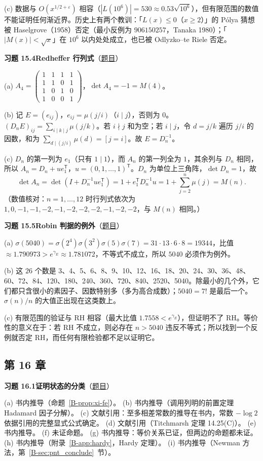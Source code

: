 \documentclass[11pt,a4paper]{article}
\newcommand{\bref}[1]{\ref*{B-#1}}
\newcommand{\Sol}[2]{%
  \par\addvspace{1.2em}\noindent
  \hypertarget{s:#1}{}\textbf{习题 #1\quad #2}\hfill{\small（\hyperlink{q:#1}{题目}）}\par
  \nopagebreak\smallskip}
\begin{document}
(c) 数据与 $O(x^{1/2+\varepsilon})$ 相容（$|L(10^6)|=530\approx0.53\sqrt{10^6}$），但有限范围的数值不能证明任何渐近界。历史上有两个教训：「$L(x)\le0$（$x\ge2$）」的 Pólya 猜想被 Haselgrove（1958）否定（最小反例为 $906150257$，Tanaka 1980）；「$|M(x)|<\sqrt x$」在 $10^6$ 以内处处成立，也已被 Odlyzko--te Riele 否定。

\Sol{15.4}{Redheffer 行列式}
(a) $A_4=\begin{pmatrix}1&1&1&1\\1&1&0&1\\1&0&1&0\\1&0&0&1\end{pmatrix}$，$\det A_4=-1=M(4)$。

(b) 记 $E=(e_{ij})$，$e_{ij}=\mu(j/i)$（$i\mid j$），否则为 $0$。$(D_nE)_{ij}=\sum_{i\mid k\mid j}\mu(j/k)$。若 $i\nmid j$ 和为空；若 $i\mid j$，令 $d=j/k$ 遍历 $j/i$ 的因数，和为 $\sum_{d\mid(j/i)}\mu(d)=[j=i]$。故 $E=D_n^{-1}$。

(c) $D_n$ 的第一列为 $e_1$（只有 $1\mid1$），而 $A_n$ 的第一列全为 $1$，其余列与 $D_n$ 相同，所以 $A_n=D_n+ue_1^{\mathsf T}$，$u=(0,1,\dots,1)^{\mathsf T}$。$D_n$ 为单位上三角阵，$\det D_n=1$，故
\[
  \det A_n=\det(I+D_n^{-1}ue_1^{\mathsf T})=1+e_1^{\mathsf T}D_n^{-1}u=1+\sum_{j=2}^n\mu(j)=M(n).
\]
（数值核对：$n=1,\dots,12$ 时行列式依次为 $1,0,-1,-1,-2,-1,-2,-2,-2,-1,-2,-2$，与 $M(n)$ 相同。）

\Sol{15.5}{Robin 判据的例外}
(a) $\sigma(5040)=\sigma(2^4)\sigma(3^2)\sigma(5)\sigma(7)=31\cdot13\cdot6\cdot8=19344$，比值 $\approx1.790973>e^{\gamma_E}\approx1.781072$，不等式不成立，所以 $5040$ 必须作为例外。

(b) 这 $26$ 个数是 3、4、5、6、8、9、10、12、16、18、20、24、30、36、48、60、72、84、120、180、240、360、720、840、2520、5040。除最小的几个外，它们都只含很小的素因子、因数特别多（多为高合成数）；$5040=7!$ 是最后一个。$\sigma(n)/n$ 的大值正出现在这类数上。

(c) 有限范围的验证与 RH 相容（最大比值 $1.7558<e^{\gamma_E}$），但证明不了 RH。等价性的意义在于：若 RH 不成立，则必存在 $n>5040$ 违反不等式；所以找到一个反例就否定 RH，而任何有限检验都不足以证明它。

\subsection*{第 16 章}

\Sol{16.1}{证明状态的分类}
(a) 书内推导（命题~\bref{prop:xi-fe}）。
(b) 书内推导（调用列明的前置定理 Hadamard 因子分解）。
(c) 文献引用：至多相差常数的推导在书内，常数 $-\log2$ 依据引用的完整显式公式确定。
(d) 文献引用（Titchmarsh 定理 14.25(C)）。
(e) 书内推导。
(f) 未证命题。
(g) 书内推导：等价关系已证，但两边的命题都未证。
(h) 书内推导（附录~\bref{app:hardy}，Hardy 定理）。
(i) 书内推导（Newman 方法，第~\bref{sec:pnt_conclude}~节）。
\end{document}
